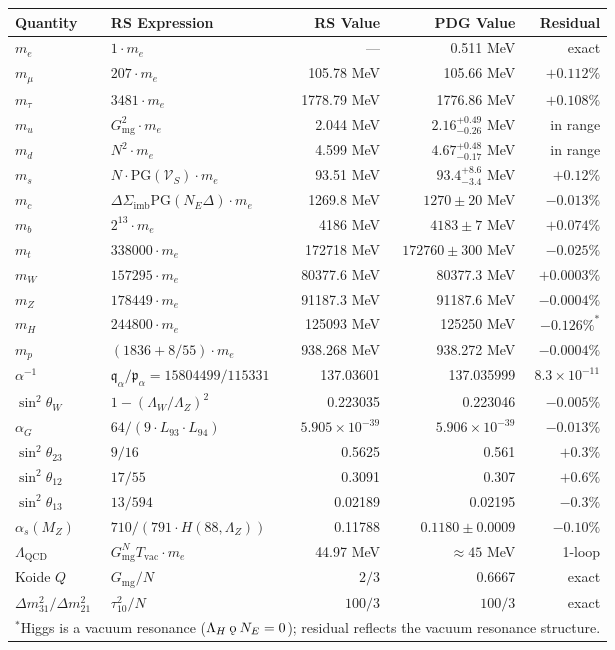 \documentclass[11pt,letterpaper]{article}
\theoremstyle{plain}
\theoremstyle{definition}
\theoremstyle{remark}
\newcommand{\koppa}{\mathbin{\text{\rm\k{o}}}}
\newcommand{\Sigimb}{\Sigma_{\mathrm{imb}}}
\newcommand{\VS}{\mathcal{V}_S}
\newcommand{\PG}{\mathrm{PG}}
\newcommand{\Gmg}{G_{\mathrm{mg}}}
\newcommand{\Tvac}{T_{\mathrm{vac}}}
\newcommand{\tauX}{\tau_{10}}
\newcommand{\pa}{\mathfrak{p}_\alpha}
\newcommand{\qa}{\mathfrak{q}_\alpha}
\newcommand{\LambdaW}{\Lambda_W}
\newcommand{\LambdaZ}{\Lambda_Z}
\newcommand{\LambdaH}{\Lambda_H}
\begin{document}
\begin{center}
\small\renewcommand{\arraystretch}{1.35}
\begin{tabular}{llrrr}
\toprule
\textbf{Quantity} & \textbf{RS Expression} &
\textbf{RS Value} & \textbf{PDG Value} & \textbf{Residual} \\
\midrule
$m_e$ & $1\cdot m_e$ & --- & 0.511 MeV & exact \\
$m_\mu$ & $207\cdot m_e$ & 105.78 MeV & 105.66 MeV & $+0.112\%$ \\
$m_\tau$ & $3481\cdot m_e$ & 1778.79 MeV & 1776.86 MeV & $+0.108\%$ \\
$m_u$ & $\Gmg^2\cdot m_e$ & 2.044 MeV
  & $2.16^{+0.49}_{-0.26}$ MeV & in range \\
$m_d$ & $N^2\cdot m_e$ & 4.599 MeV
  & $4.67^{+0.48}_{-0.17}$ MeV & in range \\
$m_s$ & $N\cdot\PG(\VS)\cdot m_e$ & 93.51 MeV
  & $93.4^{+8.6}_{-3.4}$ MeV & $+0.12\%$ \\
$m_c$ & $\Delta\Sigimb\PG(N_E\Delta)\cdot m_e$ & 1269.8 MeV
  & $1270\pm20$ MeV & $-0.013\%$ \\
$m_b$ & $2^{13}\cdot m_e$ & 4186 MeV
  & $4183\pm7$ MeV & $+0.074\%$ \\
$m_t$ & $338000\cdot m_e$ & 172718 MeV
  & $172760\pm300$ MeV & $-0.025\%$ \\
$m_W$ & $157295\cdot m_e$ & 80377.6 MeV
  & 80377.3 MeV & $+0.0003\%$ \\
$m_Z$ & $178449\cdot m_e$ & 91187.3 MeV
  & 91187.6 MeV & $-0.0004\%$ \\
$m_H$ & $244800\cdot m_e$ & 125093 MeV
  & 125250 MeV & $-0.126\%^*$ \\
$m_p$ & $(1836+8/55)\cdot m_e$ & 938.268 MeV
  & 938.272 MeV & $-0.0004\%$ \\
$\alpha^{-1}$ & $\qa/\pa=15804499/115331$ & 137.03601
  & 137.035999 & $8.3\times10^{-11}$ \\
$\sin^2\theta_W$ & $1-(\LambdaW/\LambdaZ)^2$ & 0.223035
  & 0.223046 & $-0.005\%$ \\
$\alpha_G$ & $64/(9\cdot L_{93}\cdot L_{94})$
  & $5.905\times10^{-39}$ & $5.906\times10^{-39}$ & $-0.013\%$ \\
$\sin^2\theta_{23}$ & $9/16$ & 0.5625 & 0.561 & $+0.3\%$ \\
$\sin^2\theta_{12}$ & $17/55$ & 0.3091 & 0.307 & $+0.6\%$ \\
$\sin^2\theta_{13}$ & $13/594$ & 0.02189 & 0.02195 & $-0.3\%$ \\
$\alpha_s(M_Z)$ & $710/(791\cdot H(88,\LambdaZ))$
  & 0.11788 & $0.1180\pm0.0009$ & $-0.10\%$ \\
$\Lambda_{\mathrm{QCD}}$ & $\Gmg^N\Tvac\cdot m_e$
  & 44.97 MeV & $\approx45$ MeV & 1-loop \\
Koide $Q$ & $\Gmg/N$ & $2/3$ & 0.6667 & exact \\
$\Delta m^2_{31}/\Delta m^2_{21}$ & $\tauX^2/N$
  & $100/3$ & $100/3$ & exact \\
\bottomrule
\multicolumn{5}{l}{$^*$Higgs is a vacuum resonance
($\LambdaH\koppa N_E=0$); residual reflects the vacuum resonance
structure.}
\end{tabular}
\end{center}
\end{document}
